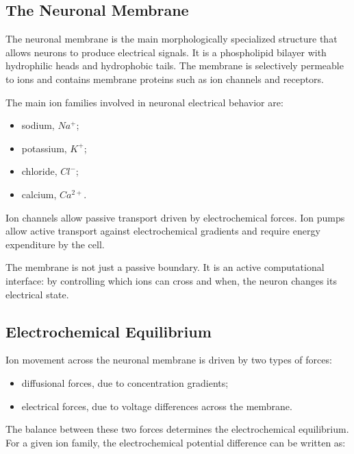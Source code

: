 \subsection{The Neuronal Membrane}

The neuronal membrane is the main morphologically specialized structure that allows neurons to produce electrical signals. It is a phospholipid bilayer with hydrophilic heads and hydrophobic tails. The membrane is selectively permeable to ions and contains membrane proteins such as ion channels and receptors.

The main ion families involved in neuronal electrical behavior are:

\begin{itemize}[noitemsep]
    \item sodium, $Na^+$;
    \item potassium, $K^+$;
    \item chloride, $Cl^-$;
    \item calcium, $Ca^{2+}$.
\end{itemize}

Ion channels allow passive transport driven by electrochemical forces. Ion pumps allow active transport against electrochemical gradients and require energy expenditure by the cell.

\begin{authornote}
The membrane is not just a passive boundary. It is an active computational interface: by controlling which ions can cross and when, the neuron changes its electrical state.
\end{authornote}

\subsection{Electrochemical Equilibrium}

Ion movement across the neuronal membrane is driven by two types of forces:

\begin{itemize}[noitemsep]
    \item diffusional forces, due to concentration gradients;
    \item electrical forces, due to voltage differences across the membrane.
\end{itemize}

The balance between these two forces determines the electrochemical equilibrium. For a given ion family, the electrochemical potential difference can be written as:

